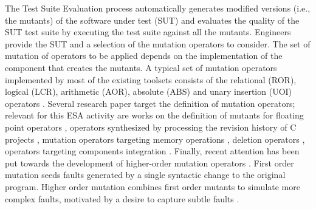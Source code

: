The Test Suite Evaluation process automatically generates modified versions (i.e., the mutants) of the software under test (SUT) and evaluates the quality of the SUT test suite by executing the test suite against all the mutants. Engineers provide the SUT and a selection of the mutation operators to consider. The set of mutation of operators to be applied depends on the implementation of the component that creates the mutants. A typical set of mutation operators implemented by most of the existing toolsets consists of the relational (ROR), logical (LCR), arithmetic (AOR), absolute (ABS) and unary insertion (UOI) operators \cite{rothermel1996experimental}. Several research paper target the definition of mutation operators; relevant for this ESA activity are works on the definition of mutants for floating point operators \cite{dan2012semantic}, operators synthesized by processing the revision history of C projects \cite{brown2017care}, mutation operators targeting memory operations \cite{wu2017memory}, deletion operators \cite{delamaro2014designing}, operators targeting components integration \cite{grechanik2016mutation}. Finally, recent attention has been put towards the development of higher-order mutation operators \cite{harman2010manifesto,ghiduk2017higher}. First order mutation seeds faults generated by a single syntactic change to the original program. Higher order mutation combines first order mutants to simulate more complex faults, motivated by a desire to capture subtle faults \cite{jia2009higher}.

